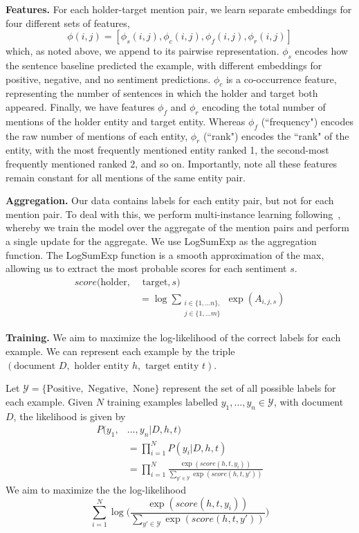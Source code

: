 \documentclass[11pt,a4paper]{article}
\begin{document}

\noindent\textbf{Features.}
For each holder-target mention pair, we learn separate embeddings for four different sets of features,
	$$\phi(i, j) = [\phi_s(i, j),  \phi_c(i, j), \phi_f(i, j), \phi_r(i, j)]$$
which, as noted above, we append to its pairwise representation.
$\phi_s$ encodes how the sentence baseline predicted the example, with different embeddings for positive, negative, and no sentiment predictions.
$\phi_c$ is a co-occurrence feature, representing the number of sentences in which the holder and target both appeared.
Finally, we have features $\phi_f$ and $\phi_r$ encoding the total number of mentions of the holder entity and target entity.
Whereas $\phi_f$ (``frequency") encodes the raw number of mentions of each entity, $\phi_r$ (``rank") encodes the ``rank" of the entity, with the most frequently mentioned entity ranked 1, the second-most frequently mentioned ranked 2, and so on.
Importantly, note all these features remain constant for all mentions of the same entity pair.

\noindent\textbf{Aggregation.}
Our data contains labels for each entity pair, but not for each mention pair.
To deal with this, we perform multi-instance learning following~, whereby we train the model over the aggregate of the mention pairs and perform a single update for the aggregate.
We use LogSumExp as the aggregation function. The LogSumExp function is a smooth approximation of the max, allowing us to extract the most probable scores for each sentiment $s$.
\begin{align*}
	score(\text{holder}, & \text{ target}, s) \\
	& = \log\sum_{\substack{i\in \{1,\dots n\},\\ j\in \{1,\dots m\}}}\exp{(A_{i, j, s})}
\end{align*}

\noindent\textbf{Training.}
We aim to maximize the log-likelihood of the correct labels for each example.
We can represent each example by the triple $(\text{document }D, \text{ holder entity }h, \text{ target entity }t)$.
\par Let $\mathcal{Y} = \{\text{Positive}, \text{ Negative}, \text{ None}\}$ represent the set of all possible labels for each example.
Given $N$ training examples labelled $y_1,\dots, y_n\in \mathcal{Y}$, with document $D$, the likelihood is given by
\begin{align*}
	P(y_1, & \dots, y_n | D, h, t) \\
	& = \prod_{i=1}^N P(y_i | D, h, t) \\
	& = \prod_{i=1}^N \frac{\exp{(score(h, t, y_i))}}{\sum_{y'\in \mathcal{Y}} \exp{(score(h, t, y'))}}
\end{align*}
We aim to maximize the the log-likelihood
	$$\sum_{i=1}^N \log{\Big(\frac{\exp{(score(h, t, y_i))}}{\sum_{y'\in \mathcal{Y}} \exp{(score(h, t, y'))}}\Big)}$$
\end{document}
